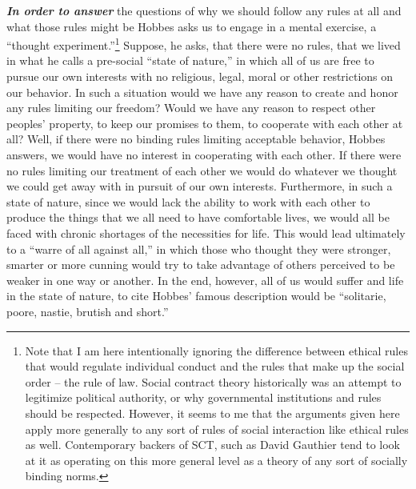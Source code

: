 \documentclass[12pt, openany]{book}
\begin{document}
\textbf{\emph{In order to answer}} the questions of why we should follow any rules at all and what those rules might be Hobbes asks us to engage in a mental exercise, a ``thought experiment.''\footnote{Note that I am here intentionally ignoring the difference between ethical rules that would regulate individual conduct and the rules that make up the social order -- the rule of law. Social contract theory historically was an attempt to legitimize political authority, or why governmental institutions and rules should be respected. However, it seems to me that the arguments given here apply more generally to any sort of rules of social interaction like ethical rules as well. Contemporary backers of SCT, such as David Gauthier tend to look at it as operating on this more general level as a theory of any sort of socially binding norms.} Suppose, he asks, that there were no rules, that we lived in what he calls a pre-social ``state of nature,'' in which all of us are free to pursue our own interests with no religious, legal, moral or other restrictions on our behavior. In such a situation would we have any reason to create and honor any rules limiting our freedom? Would we have any reason to respect other peoples' property, to keep our promises to them, to cooperate with each other at all? Well, if there were no binding rules limiting acceptable behavior, Hobbes answers, we would have no interest in cooperating with each other. If there were no rules limiting our treatment of each other we would do whatever we thought we could get away with in pursuit of our own interests. Furthermore, in such a state of nature, since we would lack the ability to work with each other to produce the things that we all need to have comfortable lives, we would all be faced with chronic shortages of the necessities for life. This would lead ultimately to a ``warre of all against all,'' in which those who thought they were stronger, smarter or more cunning would try to take advantage of others perceived to be weaker in one way or another. In the end, however, all of us would suffer and life in the state of nature, to cite Hobbes' famous description would be ``solitarie, poore, nastie, brutish and short.''
\end{document}
